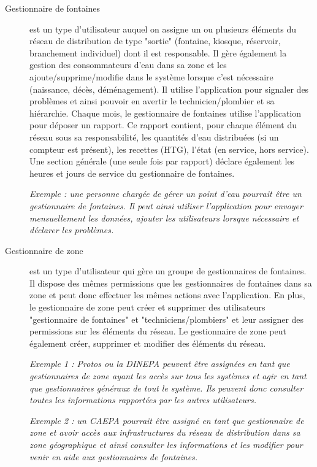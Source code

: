 \documentclass[a4paper, 11pt]{article}
\begin{document}
  \begin{description}
    \item[Gestionnaire de fontaines] est un type d'utilisateur auquel on assigne un ou plusieurs éléments du réseau de distribution de type "sortie" (fontaine, kiosque, réservoir, branchement individuel) dont il est responsable.
    Il gère également la gestion des consommateurs d'eau dans sa zone et les ajoute/supprime/modifie dans le système lorsque c'est nécessaire (naissance, décès, déménagement).
    Il utilise l'application pour signaler des problèmes et ainsi pouvoir en avertir le technicien/plombier et sa hiérarchie. Chaque mois, le gestionnaire de fontaines utilise l'application pour déposer un rapport. Ce rapport contient, pour chaque élément du réseau sous sa responsabilité, les quantités d'eau distribuées (si un compteur est présent), les recettes (HTG), l'état (en service, hors service). Une section générale (une seule fois par rapport) déclare également les heures et jours de service du gestionnaire de fontaines.

    \emph{Exemple : une personne chargée de gérer un point d'eau pourrait être un gestionnaire de fontaines. Il peut ainsi utiliser l'application pour envoyer mensuellement les données, ajouter les utilisateurs lorsque nécessaire et déclarer les problèmes.}

    \item[Gestionnaire de zone] est un type d'utilisateur qui gère un groupe de gestionnaires de fontaines. Il dispose des mêmes permissions que les gestionnaires de fontaines dans sa zone et peut donc effectuer les mêmes actions avec l'application. En plus, le gestionnaire de zone peut créer et supprimer des utilisateurs "gestionnaire de fontaines" et  "techniciens/plombiers" et leur assigner des permissions sur les éléments du réseau. Le gestionnaire de zone peut également créer, supprimer et modifier des éléments du réseau.

    \emph{Exemple 1 : Protos ou la DINEPA peuvent être assignées en tant que gestionnaires de zone ayant les accès sur tous les systèmes et agir en tant que gestionnaires généraux de tout le système. Ils peuvent donc consulter toutes les informations rapportées par les autres utilisateurs.}

    \emph{Exemple 2 : un CAEPA pourrait être assigné en tant que gestionnaire de zone et avoir accès aux infrastructures du réseau de distribution dans sa zone géographique et ainsi consulter les informations et les modifier pour venir en aide aux gestionnaires de fontaines.}


\end{description}
\end{document}
